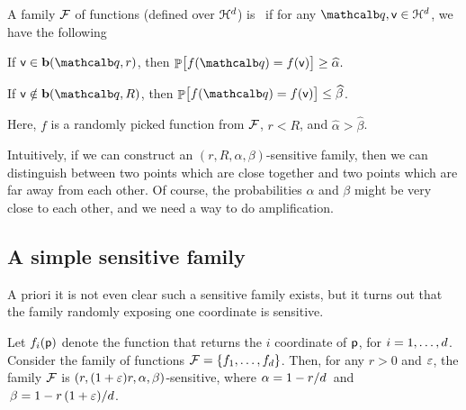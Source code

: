 \begin{defn}
    A family $\mathcal{F}$ of functions (defined over
    $\EuScript{H}^{d}$) is
    \,
     if for any
    $\query, \pntB \in \Hypercube^\hdim$, we have the following
    \begin{compactenumA}
        \smallskip
        \item If $\pntB \in \Ball( \query, r)$, then
        \begin{math}
            \Prob{ f(\query) = f(\pntB)\bigr. } \geq \widehat{\alpha}.
        \end{math}

        \smallskip

        \item If $\pntB \notin \Ball( \query, R)$, then
        $\Prob{ \bigl. f(\query) = f(\pntB) } \leq \widehat{\beta}$.
    \end{compactenumA}
    \smallskip%
    Here, $f$ is a randomly picked function from $\mathcal{F}$, $r < R$,
    and $\widehat{\alpha} > \widehat{\beta}$.
\end{defn}

Intuitively, if we can construct an $(r, R, \alpha, \beta)$-sensitive
family, then we can distinguish between two points which are close
together and two points which are far away from each other. Of course,
the probabilities $\alpha$ and $\beta$ might be very close to each
other, and we need a way to do amplification.

\subsection{A simple sensitive family} %
%
A priori it is not even clear such a sensitive family exists, but it
turns out that the family randomly exposing one coordinate is
sensitive.

\begin{lemma}
    Let $f_i(\mathsf{p})$ denote the function that returns the $i$\th
    coordinate of $\mathsf{p}$, for $i=1,\ldots, d$.  Consider the
    family of functions $\mathcal{F} = \left\{ {f_1, \ldots, f_d} \right\}$.  Then,
    for any $r>0$ and ${\varepsilon}$, the family $\mathcal{F}$ is $\ds \pth[]{
       \MakeSBig r, (1+\eps)r, \alpha, \beta }$-sensitive, where
    $\alpha = 1-{r}/{d}\,$ and $\,\beta = 1 -
    {r \,(1+{\varepsilon})}/{d}$.    
\end{lemma}

